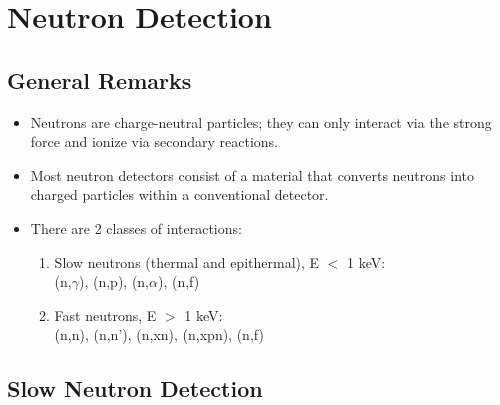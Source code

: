 \section{Neutron Detection}
\subsection{General Remarks}
\begin{itemize}
    \item Neutrons are charge-neutral particles; they can only interact via the strong force and ionize via secondary reactions.
    \item Most neutron detectors consist of a material that converts neutrons into charged particles within a conventional detector.
    \item There are 2 classes of interactions:
    \begin{enumerate}
        \item Slow neutrons (thermal and epithermal), E $<$ 1 keV:\\
        (n,$\gamma$), (n,p), (n,$\alpha$), (n,f)
        \item Fast neutrons, E $>$ 1 keV:\\
        (n,n), (n,n'), (n,xn), (n,xpn), (n,f)
    \end{enumerate}
\end{itemize}
\subsection{Slow Neutron Detection}
